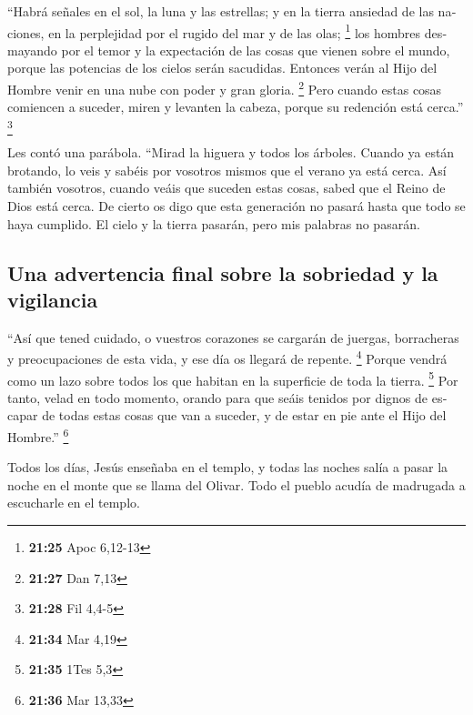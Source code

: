 \begin{paracol}{2}
\begin{otherlanguage}{english}
 ``Habrá señales en el sol, la luna y las estrellas; y en
la tierra ansiedad de las naciones, en la perplejidad por el rugido del
mar y de las olas; \footnote{\textbf{21:25} Apoc 6,12-13}
 los hombres desmayando por el temor y la expectación de
las cosas que vienen sobre el mundo, porque las potencias de los cielos
serán sacudidas.  Entonces verán al Hijo del Hombre venir
en una nube con poder y gran gloria. \footnote{\textbf{21:27} Dan 7,13}
 Pero cuando estas cosas comiencen a suceder, miren y
levanten la cabeza, porque su redención está cerca.'' \footnote{\textbf{21:28}
  Fil 4,4-5}

 Les contó una parábola. ``Mirad la higuera y todos los
árboles.  Cuando ya están brotando, lo veis y sabéis por
vosotros mismos que el verano ya está cerca.  Así también
vosotros, cuando veáis que suceden estas cosas, sabed que el Reino de
Dios está cerca.  De cierto os digo que esta generación
no pasará hasta que todo se haya cumplido.  El cielo y la
tierra pasarán, pero mis palabras no pasarán.

\hypertarget{una-advertencia-final-sobre-la-sobriedad-y-la-vigilancia}{%
\subsection{Una advertencia final sobre la sobriedad y la
vigilancia}\label{una-advertencia-final-sobre-la-sobriedad-y-la-vigilancia}}

 ``Así que tened cuidado, o vuestros corazones se
cargarán de juergas, borracheras y preocupaciones de esta vida, y ese
día os llegará de repente. \footnote{\textbf{21:34} Mar 4,19}
 Porque vendrá como un lazo sobre todos los que habitan
en la superficie de toda la tierra. \footnote{\textbf{21:35} 1Tes 5,3}
 Por tanto, velad en todo momento, orando para que seáis
tenidos por dignos de escapar de todas estas cosas que van a suceder, y
de estar en pie ante el Hijo del Hombre.'' \footnote{\textbf{21:36} Mar
  13,33}

 Todos los días, Jesús enseñaba en el templo, y todas las
noches salía a pasar la noche en el monte que se llama del Olivar.
 Todo el pueblo acudía de madrugada a escucharle en el
templo.

\switchcolumn
\begin{otherlanguage}{english}


\end{otherlanguage}
\end{otherlanguage}
\end{paracol}
